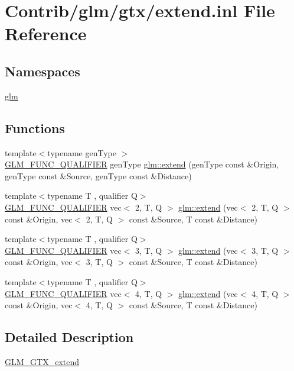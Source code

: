 \hypertarget{extend_8inl}{}\section{Contrib/glm/gtx/extend.inl File Reference}
\label{extend_8inl}
\subsection*{Namespaces}
\begin{DoxyCompactItemize}
\item 
 \mbox{\hyperlink{namespaceglm}{glm}}
\end{DoxyCompactItemize}
\subsection*{Functions}
\begin{DoxyCompactItemize}
\item 
{\footnotesize template$<$typename gen\+Type $>$ }\\\mbox{\hyperlink{setup_8hpp_a33fdea6f91c5f834105f7415e2a64407}{G\+L\+M\+\_\+\+F\+U\+N\+C\+\_\+\+Q\+U\+A\+L\+I\+F\+I\+ER}} gen\+Type \mbox{\hyperlink{namespaceglm_a88c4890406fab3280de470ce780e6b9d}{glm\+::extend}} (gen\+Type const \&Origin, gen\+Type const \&Source, gen\+Type const \&Distance)
\item 
{\footnotesize template$<$typename T , qualifier Q$>$ }\\\mbox{\hyperlink{setup_8hpp_a33fdea6f91c5f834105f7415e2a64407}{G\+L\+M\+\_\+\+F\+U\+N\+C\+\_\+\+Q\+U\+A\+L\+I\+F\+I\+ER}} vec$<$ 2, T, Q $>$ \mbox{\hyperlink{namespaceglm_ae7c7294c06e86839130ca7744162731c}{glm\+::extend}} (vec$<$ 2, T, Q $>$ const \&Origin, vec$<$ 2, T, Q $>$ const \&Source, T const \&Distance)
\item 
{\footnotesize template$<$typename T , qualifier Q$>$ }\\\mbox{\hyperlink{setup_8hpp_a33fdea6f91c5f834105f7415e2a64407}{G\+L\+M\+\_\+\+F\+U\+N\+C\+\_\+\+Q\+U\+A\+L\+I\+F\+I\+ER}} vec$<$ 3, T, Q $>$ \mbox{\hyperlink{namespaceglm_a9e3293f635716225ee23cb298a04a02f}{glm\+::extend}} (vec$<$ 3, T, Q $>$ const \&Origin, vec$<$ 3, T, Q $>$ const \&Source, T const \&Distance)
\item 
{\footnotesize template$<$typename T , qualifier Q$>$ }\\\mbox{\hyperlink{setup_8hpp_a33fdea6f91c5f834105f7415e2a64407}{G\+L\+M\+\_\+\+F\+U\+N\+C\+\_\+\+Q\+U\+A\+L\+I\+F\+I\+ER}} vec$<$ 4, T, Q $>$ \mbox{\hyperlink{namespaceglm_a4ac1a18c2563193bbc65b772e9bbc25d}{glm\+::extend}} (vec$<$ 4, T, Q $>$ const \&Origin, vec$<$ 4, T, Q $>$ const \&Source, T const \&Distance)
\end{DoxyCompactItemize}


\subsection{Detailed Description}
\mbox{\hyperlink{group__gtx__extend}{G\+L\+M\+\_\+\+G\+T\+X\+\_\+extend}} 